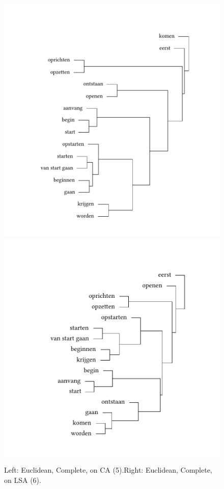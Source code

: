 \begin{figure}
\includegraphics[width=.48\textwidth,trim=95 40 75 75]{figures/tree34.pdf}\hfill%
\includegraphics[width=.48\textwidth,trim=95 40 75 75]{figures/tree35.pdf}
\caption{\label{fig:3:34}Left: Euclidean, Complete, on CA (5).\label{fig:3:35}Right: Euclidean, Complete, on LSA (6).}
\end{figure}

